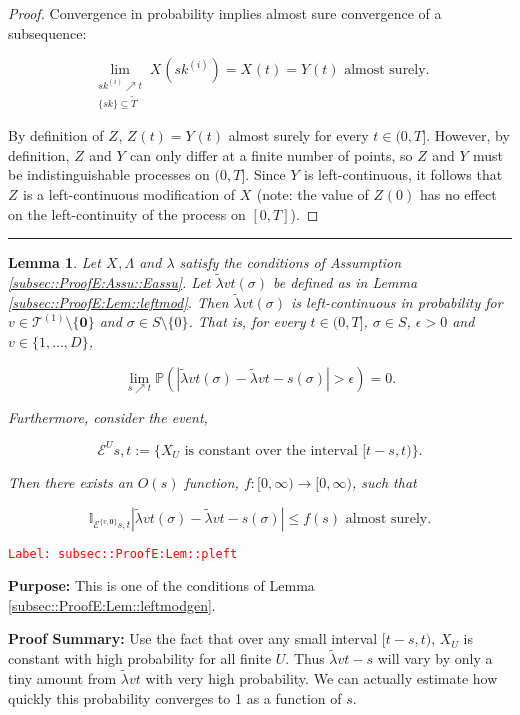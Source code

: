 \documentclass[12pt]{article}
\newcommand{\mb}{\mathbb}
\newcommand{\mc}{\mathcal}
\newcommand{\ra}{\rightarrow}
\newcommand{\te}{\text}
\newcommand{\ep}{\epsilon}
\newcommand{\tr}{\textcolor{red}}
\newcommand{\labe}[1]{\tr{\texttt{Label: #1}}}
\newcommand{\purpose}{\textbf{Purpose: }}
\newcommand{\pfsum}{\textbf{Proof Summary: }}
\newcommand{\lin}{\rule{\linewidth}{0.4 pt}}
\newcommand{\pr}{\mb{P}}							%
\renewcommand{\root}{\mathbf{0}}				%
\renewcommand{\v}{v}							%
\renewcommand{\U}{U}							%
\renewcommand{\S}{S}							%
\newcommand{\s}{\sigma}							%
\newcommand{\T}{T}								%
\renewcommand{\t}{t}							%
\renewcommand{\tt}{s}							%
\newcommand{\X}{X}								%
\newcommand{\vind}[1]{^{#1}}					%
\newcommand{\cind}[1]{_{#1}}					%
\newcommand{\tp}[1]{(#1)}						%
\newcommand{\tip}[1]{#1}						%
\newcommand{\degr}{D}							%
\newcommand{\tree}{\mc{T}}						%
\newcommand{\sln}[1]{^{(#1)}}					%
\newcommand{\rate}{\lambda}						%
\newcommand{\alt}[1]{\widetilde{#1}}			%
\newcommand{\XX}{Y}								%
\newcommand{\XXX}{Z}							%
\renewcommand{\it}{k}							%
\newcommand{\evnt}{\mc{E}}						%
\newcommand{\Tset}{\alt{T}}						%
\newcommand{\ratee}{\Lambda}					%
\newcommand{\crate}{\alt{\lambda}}				%
\newtheorem{lem}[thms]{Lemma}
\begin{document}
\begin{proof}
Convergence in probability implies almost sure convergence of a subsequence:

\[\lim_{\substack{\tt{\it\sln{i}} \nearrow \t\\\{\tt{\it}\}\subseteq \Tset}} \X\cind{}\tp{\tt{\it\sln{i}}} = \X\cind{}\tp{\t} = \XX\cind{}\tp{\t} \te{ almost surely.}\]

By definition of \(\XXX\cind{}\tip{}\), \(\XXX\cind{}\tp{\t} = \XX\cind{}\tp{\t}\) almost surely for every \(\t \in (0,\T]\). However, by definition, \(\XXX\cind{}\tip{}\) and \(\XX\cind{}\tip{}\) can only differ at a finite number of points, so \(\XXX\cind{}\tip{}\) and \(\XX\cind{}\tip{}\) must be indistinguishable processes on \((0,\T]\). Since \(\XX\cind{}\tip{}\) is left-continuous, it follows that \(\XXX\cind{}\tip{}\) is a left-continuous modification of \(\X\cind{}\tip{}\) (note: the value of \(\XXX\cind{}\tp{0}\) has no effect on the left-continuity of the process on \([0,\T]\)).
\end{proof}

\lin

\begin{lem}
Let \(\X\cind{}\tip{},\ratee\) and \(\rate{}\) satisfy the conditions of Assumption \ref{subsec::ProofE:Assu::Eassu}. Let \(\crate{\v}{\t}(\s)\) be defined as in Lemma \ref{subsec::ProofE:Lem::leftmod}. Then \(\crate{\v}{\t}(\s)\) is left-continuous in probability for \(\v \in \tree\sln{1}\setminus\{\root\}\) and \(\s \in \S\setminus\{0\}\). That is, for every \(\t \in (0,\T]\), \(\s \in \S\), \(\ep > 0\) and \(\v\in \{1,\dots,\degr\}\),

\[\lim_{\tt \nearrow \t}\pr\left(|\crate{\v}{\t}(\s)- \crate{\v}{\t-\tt}(\s)| > \ep\right) = 0.\]

Furthermore, consider the event,

\[\evnt\vind{\U}{\tt,\t} := \{\X\cind{\U}\tip{} \te{ is constant over the interval } [\t-\tt,\t)\}.\]

Then there exists an \(O(\tt)\) function, \(f:[0,\infty)\ra[0,\infty)\), such that 

\[\mb{I}_{\evnt\vind{\{\v,\root\}}{\tt,\t}}|\crate{\v}{\t}(\s) - \crate{\v}{\t-\tt}(\s)| \leq f(\tt) \te{ almost surely.}\]
\label{subsec::ProofE:Lem::pleft}
\end{lem}
\labe{subsec::ProofE:Lem::pleft}

\purpose This is one of the conditions of Lemma \ref{subsec::ProofE:Lem::leftmodgen}.

\pfsum Use the fact that over any small interval \([\t-\tt,\t)\), \(\X\cind{U}\) is constant with high probability for all finite \(U\). Thus \(\crate{v}{\t-\tt}\) will vary by only a tiny amount from \(\crate{v}{\t}\) with very high probability. We can actually estimate how quickly this probability converges to 1 as a function of \(s\).
\end{document}
